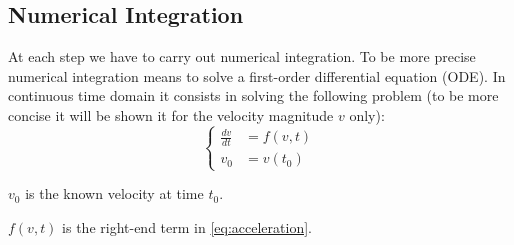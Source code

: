\documentclass{article}
\begin{document}
\subsection{Numerical Integration}
At each step we have to carry out numerical integration. To be more precise numerical integration means to solve a first-order differential equation (ODE). In continuous time domain it consists in solving the following problem (to be more concise it will be shown it for the velocity magnitude $v$ only):
\begin{equation} %
\left\{
\begin{aligned}
\frac{dv}{dt} &= f(v, t) \\
v_0 &= v(t_0)
\end{aligned}
\right.
\end{equation}
\begin{description}
\item $v_0$ is the known velocity at time $t_0$.
\item $f(v,t)$ is the right-end term in \eqref{eq:acceleration}.
\end{description}
 
\end{document}

